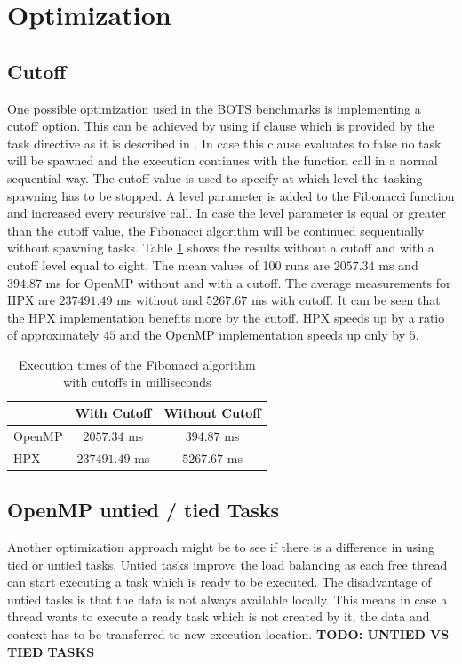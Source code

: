 \section{Optimization}
\subsection{Cutoff}
  One possible optimization used in the BOTS benchmarks is implementing a cutoff option.
  This can be achieved by using if clause which is provided by the task directive as it is described in \cite{MKlemm.2018}.
  In case this clause evaluates to false no task will be spawned and the execution continues with the function call in a normal sequential way.
  The cutoff value is used to specify at which level the tasking spawning has to be stopped.
  A level parameter is added to the Fibonacci function and increased every recursive call.
  In case the level parameter is equal or greater than the cutoff value, the Fibonacci algorithm will be continued sequentially without spawning tasks. 
  Table \ref{tab:cutoff} shows the results without a cutoff and with a cutoff level equal to eight.
  The mean values of 100 runs are \(2057.34\) ms and \(394.87\) ms for OpenMP without and with a cutoff.
The average measurements for HPX are \(237491.49\) ms without and \(5267.67\) ms with cutoff.
It can be seen that the HPX implementation benefits more by the cutoff.
HPX speeds up by a ratio of approximately \(45\) and the OpenMP implementation speeds up only by \(5\).

\begin{table}
\centering
\caption{Execution times of the Fibonacci algorithm with cutoffs in milliseconds}
\begin{tabular}[h]{|l|c|c|}
\hline
 & With Cutoff & Without Cutoff \\\hline
OpenMP & \(2057.34\) ms & \(394.87\) ms \\\hline
HPX & \(237491.49\) ms & \(5267.67\) ms \\\hline
\end{tabular}
\label{tab:cutoff}
\end{table}

\subsection{OpenMP untied / tied Tasks}
  Another optimization approach might be to see if there is a difference in using tied or untied tasks.
  Untied tasks improve the load balancing as each free thread can start executing a task which is ready to be executed.
  The disadvantage of untied tasks is that the data is not always available locally.
  This means in case a thread wants to execute a ready task which is not created by it, the data and context has to be transferred to new execution location.
  \textbf{TODO: UNTIED VS TIED TASKS}	

